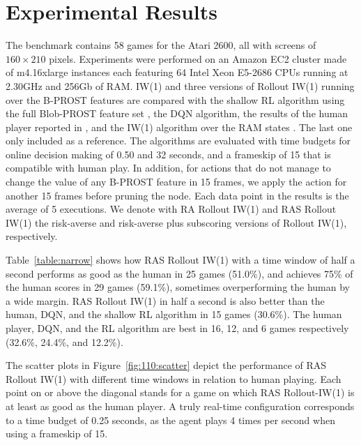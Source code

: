 \documentclass[letterpaper]{article}
\begin{document}
\section{Experimental Results}

The benchmark contains 58 games for the Atari 2600, all with screens of $160\times210$
pixels.
Experiments were performed on an Amazon EC2 cluster made of m4.16xlarge
instances each featuring 64 Intel Xeon E5-2686 CPUs running at 2.30GHz
and 256Gb of RAM.
IW(1) and three versions of Rollout IW(1) running over the B-PROST features
are compared with the shallow RL algorithm using the full Blob-PROST feature
set \cite{shallow}, the DQN algorithm, the results of the human player
reported in \cite{dqn}, and the IW(1) algorithm over the RAM states \cite{nir:ijcai2015}.
The last one only included as a reference.
The algorithms are evaluated with time budgets for online decision making of
0.50 and 32 seconds, and a frameskip of 15 that is compatible with human play.
In addition, for actions that do not manage to change the value of any B-PROST
feature in 15 frames, we apply the action for another 15 frames before pruning
the node. Each data point in the results is the average of 5 executions.
We denote with RA Rollout IW(1) and RAS Rollout IW(1) the risk-averse and
risk-averse plus subscoring versions of Rollout IW(1), respectively.

Table~\ref{table:narrow} shows how RAS Rollout IW(1) with a time window of half
a second performs as good as the human in 25 games (51.0\%), and achieves 75\%
of the human scores in 29 games (59.1\%), sometimes overperforming the human by
a wide margin.
RAS Rollout IW(1) in half a second is also better than the human, DQN, and the
shallow RL algorithm in 15 games (30.6\%).
The human player, DQN, and the RL algorithm are best in 16, 12, and 6 games
respectively (32.6\%, 24.4\%, and 12.2\%).

The scatter plots in Figure~\ref{fig:110:scatter} depict the performance of RAS
Rollout IW(1) with different time windows in relation to human playing.
Each point on or above the diagonal stands for a game on which RAS Rollout-IW(1)
is at least as good as the human player. A truly real-time configuration corresponds
to a time budget of 0.25 seconds, as the agent plays 4 times per second when using
a frameskip of 15.
\end{document}
